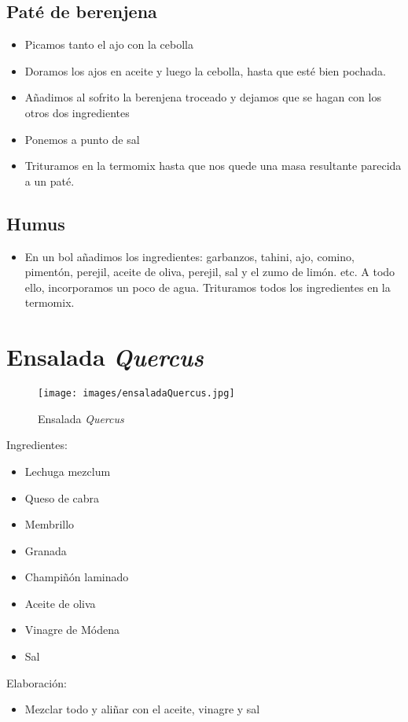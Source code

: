 \subsection{Paté de berenjena}
\label{sec:pateberen}
\begin{itemize}
\item Picamos tanto el ajo con la cebolla
\item Doramos los ajos en aceite y luego la cebolla, hasta que esté bien pochada.
\item Añadimos al sofrito la berenjena troceado y dejamos que se hagan con los otros dos ingredientes
\item Ponemos a punto de sal
\item Trituramos en la termomix hasta que nos quede una masa resultante parecida a un paté.
\end{itemize}

\subsection{Humus}
\label{sec:humus}
\begin{itemize}
\item En un bol añadimos los ingredientes: garbanzos, tahini, ajo, comino, pimentón, perejil, aceite de oliva, perejil, sal y el zumo de limón. etc. A todo ello, incorporamos un poco de agua. Trituramos todos los ingredientes en la termomix.
\end{itemize}

\section{Ensalada \emph{Quercus}}
\label{sec:ensaladaQ}

\begin{figure}[h]
  \begin{center}
    \texttt{[image: images/ensaladaQuercus.jpg]}
    \caption{Ensalada \emph{Quercus}}
    \label{fig:ensaladaQuercus}
  \end{center}
\end{figure}

Ingredientes:
\begin{itemize}
\item Lechuga mezclum
\item Queso de cabra
\item Membrillo
\item Granada
\item Champiñón laminado
\item Aceite de oliva
\item Vinagre de Módena
\item Sal
\end{itemize}
Elaboración:
\begin{itemize}
\item Mezclar todo y aliñar con el aceite, vinagre y sal
\end{itemize}

